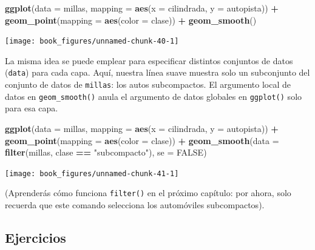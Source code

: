 \documentclass[11pt,oneside]{report}
\newenvironment{Shaded}{\begin{snugshade}}{\end{snugshade}}
\newcommand{\DataTypeTok}[1]{\textcolor[rgb]{0.13,0.29,0.53}{#1}}
\newcommand{\KeywordTok}[1]{\textcolor[rgb]{0.13,0.29,0.53}{\textbf{#1}}}
\newcommand{\NormalTok}[1]{#1}
\newcommand{\OperatorTok}[1]{\textcolor[rgb]{0.81,0.36,0.00}{\textbf{#1}}}
\newcommand{\OtherTok}[1]{\textcolor[rgb]{0.56,0.35,0.01}{#1}}
\newcommand{\StringTok}[1]{\textcolor[rgb]{0.31,0.60,0.02}{#1}}
\begin{document}
\begin{Shaded}
\begin{Highlighting}[]
\KeywordTok{ggplot}\NormalTok{(}\DataTypeTok{data =}\NormalTok{ millas, }\DataTypeTok{mapping =} \KeywordTok{aes}\NormalTok{(}\DataTypeTok{x =}\NormalTok{ cilindrada, }\DataTypeTok{y =}\NormalTok{ autopista)) }\OperatorTok{+}
\StringTok{  }\KeywordTok{geom_point}\NormalTok{(}\DataTypeTok{mapping =} \KeywordTok{aes}\NormalTok{(}\DataTypeTok{color =}\NormalTok{ clase)) }\OperatorTok{+}
\StringTok{  }\KeywordTok{geom_smooth}\NormalTok{()}
\end{Highlighting}
\end{Shaded}

\begin{center}\texttt{[image: book\_figures/unnamed-chunk-40-1]} \end{center}

La misma idea se puede emplear para especificar distintos conjuntos de
datos (\texttt{data}) para cada capa. Aquí, nuestra línea suave muestra
solo un subconjunto del conjunto de datos de \texttt{millas}: los autos
subcompactos. El argumento local de datos en \texttt{geom\_smooth()}
anula el argumento de datos globales en \texttt{ggplot()} solo para esa
capa.

\begin{Shaded}
\begin{Highlighting}[]
\KeywordTok{ggplot}\NormalTok{(}\DataTypeTok{data =}\NormalTok{ millas, }\DataTypeTok{mapping =} \KeywordTok{aes}\NormalTok{(}\DataTypeTok{x =}\NormalTok{ cilindrada, }\DataTypeTok{y =}\NormalTok{ autopista)) }\OperatorTok{+}
\StringTok{  }\KeywordTok{geom_point}\NormalTok{(}\DataTypeTok{mapping =} \KeywordTok{aes}\NormalTok{(}\DataTypeTok{color =}\NormalTok{ clase)) }\OperatorTok{+}
\StringTok{  }\KeywordTok{geom_smooth}\NormalTok{(}\DataTypeTok{data =} \KeywordTok{filter}\NormalTok{(millas, clase }\OperatorTok{==}\StringTok{ "subcompacto"}\NormalTok{), }\DataTypeTok{se =} \OtherTok{FALSE}\NormalTok{)}
\end{Highlighting}
\end{Shaded}

\begin{center}\texttt{[image: book\_figures/unnamed-chunk-41-1]} \end{center}

(Aprenderás cómo funciona \texttt{filter()} en el próximo capítulo: por
ahora, solo recuerda que este comando selecciona los automóviles
subcompactos).

\hypertarget{ejercicios-3}{%
\subsection{Ejercicios}\label{ejercicios-3}}
\end{document}
